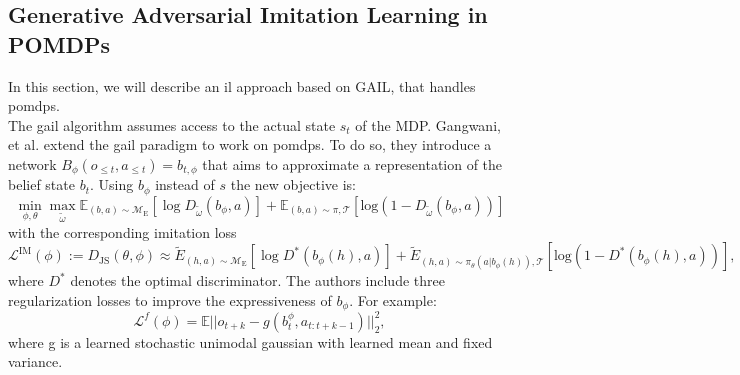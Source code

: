 \subsection{Generative Adversarial Imitation Learning in POMDPs}
\label{GAIL_POMDPS}
In this section, we will describe an \ac{il} approach based on GAIL, that handles \ac{pomdp}s.\\
The \ac{gail} algorithm assumes access to the actual state $s_t$ of the MDP. Gangwani, et al. \cite{gangwani2019learning} 
extend the \ac{gail} paradigm to work on \ac{pomdp}s. To do so, they introduce a network $B_{\phi}(o_{\leq t}, a_{\leq t}) = b_{t, \phi}$ that aims to approximate a 
representation of the belief state $b_t$. Using $b_{\phi}$ instead of $s$ the new objective is:
\begin{equation}
    \min_{\phi,\theta}\max_{\tilde{\omega}} \mathbb{E}_{(b,a)\sim\mathcal{M}_{\text{E}}}[\log D_{\tilde{\omega}}(b_{\phi},a)] + \mathbb{E}_{(b,a)\sim\pi,\mathcal{T}}[\mathrm{log}(1-D_{\tilde{\omega}}(b_{\phi},a))]
\end{equation}
with the corresponding imitation loss 
\begin{equation*}
    \mathcal{L}^{\text{IM}}(\phi) := D_{\text{JS}}(\theta,\phi) \approx \tilde{E}_{(h,a)\sim \mathcal{M}_\text{E}}[\log D^*(b_\phi(h),a)] + \tilde{E}_{(h,a)\sim \pi_\theta(a|b_\phi(h)),\mathcal{T}}[\mathrm{log}(1 - D^*(b_\phi(h),a))], 
\end{equation*}
where $D^*$ denotes the optimal discriminator. 
The authors include three regularization losses to improve the expressiveness of $b_{\phi}$. For example:
\begin{equation}
    \mathcal{L}^f(\phi) = \mathbb{E}|| o_{t+k} - g(b_t^\phi, a_{t:t+k-1})||_2^2,
\end{equation}
where g is a learned stochastic unimodal gaussian with learned mean and fixed variance.\\

